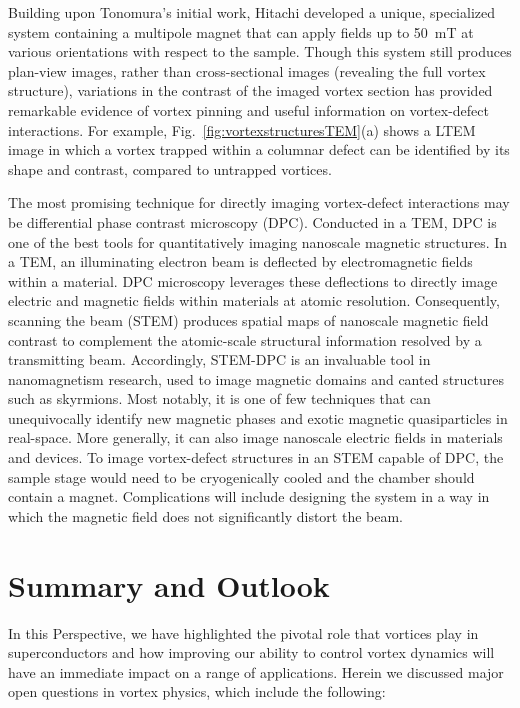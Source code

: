 \documentclass[%
 aip,
 amsmath,amssymb,
 reprint,%
floatfix]{revtex4-1}
\begin{document}
Building upon Tonomura's initial work, Hitachi\cite{Harada2008, Kawasaki2000} developed a unique, specialized system containing a multipole magnet that can apply fields up to \SI{50}{\milli\tesla} at various orientations with respect to the sample. Though this system still produces plan-view images, rather than cross-sectional images (revealing the full vortex structure), variations in the contrast of the imaged vortex section has provided remarkable evidence of vortex pinning and useful information on vortex-defect interactions.\cite{Kamimura2002, HARADA20131, PhysRevLett.88.237001, Tonomura2001}  For example, Fig.~\ref{fig:vortexstructuresTEM}(a) shows a LTEM image in which a vortex trapped within a columnar defect can be identified by its shape and contrast, compared to untrapped vortices.

The most promising technique for directly imaging vortex-defect interactions may be differential phase contrast microscopy (DPC)\cite{Lubk2015}. Conducted in a TEM, DPC is one of the best tools for quantitatively imaging nanoscale magnetic structures.  In a TEM, an illuminating electron beam is deflected by electromagnetic fields within a material. DPC microscopy leverages these deflections to directly image electric and magnetic fields within materials at atomic resolution\cite{Dekkers1974, Chapman1978}.  Consequently, scanning the beam (STEM) produces spatial maps of nanoscale magnetic field contrast to complement the atomic-scale structural information resolved by a transmitting beam.  Accordingly, STEM-DPC is an invaluable tool in nanomagnetism research, used to image magnetic domains\cite{Lee2017, Chen2018} and canted structures such as skyrmions\cite{McVitie2018, Matsumotoe1501280, Schneider2018}.  Most notably, it is one of few techniques that can unequivocally identify new magnetic phases and exotic magnetic quasiparticles in real-space. More generally, it can also image nanoscale electric fields\cite{Muller2014, Hachtel2018, Shibata2012, Shibata2017, Yucelen2018} in materials and devices.  To image vortex-defect structures in an STEM capable of DPC, the sample stage would need to be cryogenically cooled and the chamber should contain a magnet. Complications will include designing the system in a way in which the magnetic field does not significantly distort the beam.



\section{Summary and Outlook}
In this Perspective, we have highlighted the pivotal role that vortices play in superconductors and how improving our ability to control vortex dynamics will have an immediate impact on a range of applications. Herein we discussed major open questions in vortex physics, which include the following:
\end{document}
